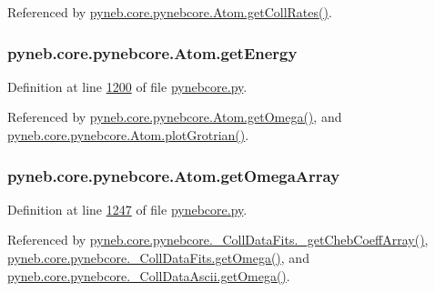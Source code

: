Referenced by \hyperlink{pynebcore_8py_source_l01329}{pyneb.\+core.\+pynebcore.\+Atom.\+get\+Coll\+Rates()}.

\hypertarget{classpyneb_1_1core_1_1pynebcore_1_1_atom_a9940acb2999e864edf9761d822e65d7f}{}
\subsubsection[{get\+Energy}]{\setlength{\rightskip}{0pt plus 5cm}pyneb.\+core.\+pynebcore.\+Atom.\+get\+Energy}\label{classpyneb_1_1core_1_1pynebcore_1_1_atom_a9940acb2999e864edf9761d822e65d7f}


Definition at line \hyperlink{pynebcore_8py_source_l01200}{1200} of file \hyperlink{pynebcore_8py_source}{pynebcore.\+py}.



Referenced by \hyperlink{pynebcore_8py_source_l01262}{pyneb.\+core.\+pynebcore.\+Atom.\+get\+Omega()}, and \hyperlink{pynebcore_8py_source_l02372}{pyneb.\+core.\+pynebcore.\+Atom.\+plot\+Grotrian()}.

\hypertarget{classpyneb_1_1core_1_1pynebcore_1_1_atom_a82067d384b463179a274711b618f03b5}{}
\subsubsection[{get\+Omega\+Array}]{\setlength{\rightskip}{0pt plus 5cm}pyneb.\+core.\+pynebcore.\+Atom.\+get\+Omega\+Array}\label{classpyneb_1_1core_1_1pynebcore_1_1_atom_a82067d384b463179a274711b618f03b5}


Definition at line \hyperlink{pynebcore_8py_source_l01247}{1247} of file \hyperlink{pynebcore_8py_source}{pynebcore.\+py}.



Referenced by \hyperlink{pynebcore_8py_source_l00734}{pyneb.\+core.\+pynebcore.\+\_\+\+Coll\+Data\+Fits.\+\_\+get\+Cheb\+Coeff\+Array()}, \hyperlink{pynebcore_8py_source_l00811}{pyneb.\+core.\+pynebcore.\+\_\+\+Coll\+Data\+Fits.\+get\+Omega()}, and \hyperlink{pynebcore_8py_source_l01063}{pyneb.\+core.\+pynebcore.\+\_\+\+Coll\+Data\+Ascii.\+get\+Omega()}.

